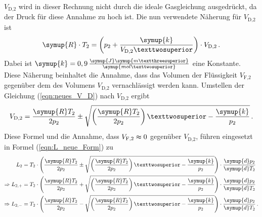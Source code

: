     $V_{\text{D,2}}$ wird in dieser Rechnung nicht durch die ideale Gasgleichung ausgedrückt, da der Druck für diese
    Annahme zu hoch ist. Die nun verwendete Näherung für $V_{\text{D,2}}$ ist
    \begin{equation}
      \symup{R} \cdot T_2 = \left(p_2 + \frac{\symup{k}}{V_{\text{D,2}}²}\right) \cdot V_{\text{D,2}} \, .
      \label{eqn:neues_V_D}
    \end{equation}
    Dabei ist $\symup{k} = 0,9 \, \frac{\symup{J}\symup{m³}}{\symup{mol²}}$ eine Konstante. Diese Näherung 
    beinhaltet die Annahme, dass das Volumen der Flüssigkeit $V_{\text{F,2}}$ gegenüber dem des Volumens $V_{\text{D,2}}$ vernachlässigt
    werden kann. 
    Umstellen der Gleichung (\ref{eqn:neues_V_D}) nach $V_{\text{D,2}}$ ergibt
    \begin{equation}
      V_{\text{D,2}} = \frac{\symup{R}T_2}{2 p_2} \pm \sqrt{\left(\frac{\symup{R}T_2}{2p_2}\right)² - \frac{\symup{k}}{p_2}} \, .
    \end{equation}
    Diese Formel und die Annahme, dass $V_{\text{F,2}} \thickapprox 0$ gegenüber $V_{\text{D,2}}$, führen eingesetzt in Formel (\ref{eqn:L_neue_Form}) zu 
    \begin{align*}
      L_2 &= T_2 \cdot \left(\frac{\symup{R}T_2}{2 p_2} \pm \sqrt{\left(\frac{\symup{R}T_2}{2p_2}\right)² - \frac{\symup{k}}{p_2}}\right) \cdot \frac{\symup{d}p_2}{\symup{d}T_2} \\
      \Rightarrow L_{2,+} &= T_2 \cdot \left(\frac{\symup{R}T_2}{2 p_2} + \sqrt{\left(\frac{\symup{R}T_2}{2p_2}\right)² - \frac{\symup{k}}{p_2}}\right) \cdot \frac{\symup{d}p_2}{\symup{d}T_2} \\
      \Rightarrow L_{2,-} &= T_2 \cdot \left(\frac{\symup{R}T_2}{2 p_2} - \sqrt{\left(\frac{\symup{R}T_2}{2p_2}\right)² - \frac{\symup{k}}{p_2}}\right) \cdot \frac{\symup{d}p_2}{\symup{d}T_2} \, .
    \end{align*}
    
